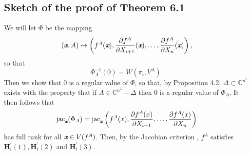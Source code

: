 \documentclass[sigconf]{acmart}
\def\xb{\textit{\textbf{x}}}
\def\C{\mathbb{C}}
\def\jac{ \textrm{jac}}
\def\pa{\partial}
\begin{document}
\subsection{Sketch of the proof of Theorem 6.1}
We will let $\Phi$ be the mapping 
\[
(\xb,A) \mapsto \left(f^A(\xb), \frac{\partial f^A}{\partial X_{i+1}}(\xb),\hdots,\frac{\partial f^A}{\partial X_n}(\xb)\right),
\] 
so that 
\[
\Phi_A^{-1}(0)= W(\pi_i,V^A).
\]
Then we show that $0$ is a regular value of $\Phi$, so that, by Proposition 4.2, $\Delta \subset \C^{n^2}$ exists with the property that if $A \in \C^{n^2}-\Delta$ then $0$ is a regular value of $\Phi_A.$ It then follows that 
\[
\jac_{\xb}(\Phi_A) = \jac_{\xb}\left(f^A(x),\frac{\pa f^A(x)}{\pa X_{i+1}},\hdots,\frac{\pa f^A(x)}{\pa X_n}\right)
\]
has full rank for all $\xb \in V(f^A)$. Then, by the Jacobian criterion \cite[Theorem 16.19]{ECA}, $f^A$ satisfies $\textbf{H}_i^{'}(1),\textbf{H}_i^{'}(2)$ and $\textbf{H}_i^{'}(3)$.
\end{document}
